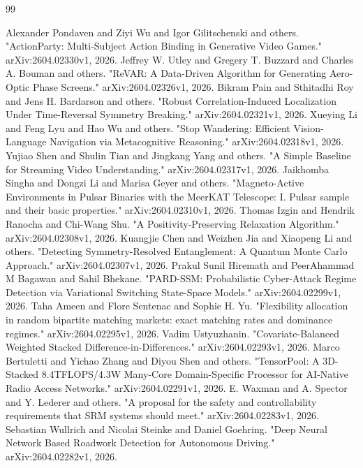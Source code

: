 \documentclass[11pt,a4paper]{article}
\begin{document}
\begin{thebibliography}{99}

 Alexander Pondaven and Ziyi Wu and Igor Gilitschenski and others. "ActionParty: Multi-Subject Action Binding in Generative Video Games." arXiv:2604.02330v1, 2026.
 Jeffrey W. Utley and Gregery T. Buzzard and Charles A. Bouman and others. "ReVAR: A Data-Driven Algorithm for Generating Aero-Optic Phase Screens." arXiv:2604.02326v1, 2026.
 Bikram Pain and Sthitadhi Roy and Jens H. Bardarson and others. "Robust Correlation-Induced Localization Under Time-Reversal Symmetry Breaking." arXiv:2604.02321v1, 2026.
 Xueying Li and Feng Lyu and Hao Wu and others. "Stop Wandering: Efficient Vision-Language Navigation via Metacognitive Reasoning." arXiv:2604.02318v1, 2026.
 Yujiao Shen and Shulin Tian and Jingkang Yang and others. "A Simple Baseline for Streaming Video Understanding." arXiv:2604.02317v1, 2026.
 Jaikhomba Singha and Dongzi Li and Marisa Geyer and others. "Magneto-Active Environments in Pulsar Binaries with the MeerKAT Telescope: I. Pulsar sample and their basic properties." arXiv:2604.02310v1, 2026.
 Thomas Izgin and Hendrik Ranocha and Chi-Wang Shu. "A Positivity-Preserving Relaxation Algorithm." arXiv:2604.02308v1, 2026.
 Kuangjie Chen and Weizhen Jia and Xiaopeng Li and others. "Detecting Symmetry-Resolved Entanglement: A Quantum Monte Carlo Approach." arXiv:2604.02307v1, 2026.
 Prakul Sunil Hiremath and PeerAhammad M Bagawan and Sahil Bhekane. "PARD-SSM: Probabilistic Cyber-Attack Regime Detection via Variational Switching State-Space Models." arXiv:2604.02299v1, 2026.
 Taha Ameen and Flore Sentenac and Sophie H. Yu. "Flexibility allocation in random bipartite matching markets: exact matching rates and dominance regimes." arXiv:2604.02295v1, 2026.
 Vadim Ustyuzhanin. "Covariate-Balanced Weighted Stacked Difference-in-Differences." arXiv:2604.02293v1, 2026.
 Marco Bertuletti and Yichao Zhang and Diyou Shen and others. "TensorPool: A 3D-Stacked 8.4TFLOPS/4.3W Many-Core Domain-Specific Processor for AI-Native Radio Access Networks." arXiv:2604.02291v1, 2026.
 E. Waxman and A. Spector and Y. Lederer and others. "A proposal for the safety and controllability requirements that SRM systems should meet." arXiv:2604.02283v1, 2026.
 Sebastian Wullrich and Nicolai Steinke and Daniel Goehring. "Deep Neural Network Based Roadwork Detection for Autonomous Driving." arXiv:2604.02282v1, 2026.

\end{thebibliography}
\end{document}
